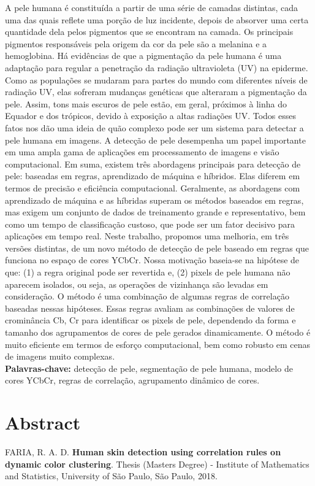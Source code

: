 \documentclass[11pt,twoside,a4paper]{book}
\theoremstyle{plain}
\theoremstyle{definition}
\begin{document}
A pele humana é constituída a partir de uma série de camadas distintas, cada uma das quais reflete uma porção de luz incidente, depois de absorver uma certa quantidade dela pelos pigmentos que se encontram na camada. Os principais pigmentos responsáveis pela origem da cor da pele são a melanina e a hemoglobina. Há evidências de que a pigmentação da pele humana é uma adaptação para regular a penetração da radiação ultravioleta (UV) na epiderme. Como as populações se mudaram para partes do mundo com diferentes níveis de radiação UV, elas sofreram mudanças genéticas que alteraram a pigmentação da pele. Assim, tons mais escuros de pele estão, em geral, próximos à linha do Equador e dos trópicos, devido à exposição a altas radiações UV. Todos esses fatos nos dão uma ideia de quão complexo pode ser um sistema para detectar a pele humana em imagens. A detecção de pele desempenha um papel importante em uma ampla gama de aplicações em processamento de imagens e visão computacional. Em suma, existem três abordagens principais para detecção de pele: baseadas em regras, aprendizado de máquina e híbridos. Elas diferem em termos de precisão e eficiência computacional. Geralmente, as abordagens com aprendizado de máquina e as híbridas superam os métodos baseados em regras, mas exigem um conjunto de dados de treinamento grande e representativo, bem como um tempo de classificação custoso, que pode ser um fator decisivo para aplicações em tempo real. Neste trabalho, propomos uma melhoria, em três versões distintas, de um novo método de detecção de pele baseado em regras que funciona no espaço de cores YCbCr. Nossa motivação baseia-se na hipótese de que: (1) a regra original pode ser revertida e, (2) pixels de pele humana não aparecem isolados, ou seja, as operações de vizinhança são levadas em consideração. O método é uma combinação de algumas regras de correlação baseadas nessas hipóteses. Essas regras avaliam as combinações de valores de crominância Cb, Cr para identificar os pixels de pele, dependendo da forma e tamanho dos agrupamentos de cores de pele gerados dinamicamente. O método é muito eficiente em termos de esforço computacional, bem como robusto em cenas de imagens muito complexas.
\\

\noindent \textbf{Palavras-chave:} detecção de pele, segmentação de pele humana, modelo de cores YCbCr, regras de correlação, agrupamento dinâmico de cores.

\chapter*{Abstract}
\noindent FARIA, R. A. D. \textbf{Human skin detection using correlation rules on dynamic color clustering}.
Thesis (Masters Degree) - Institute of Mathematics and Statistics,
University of São Paulo, São Paulo, 2018.
\\
\end{document}
